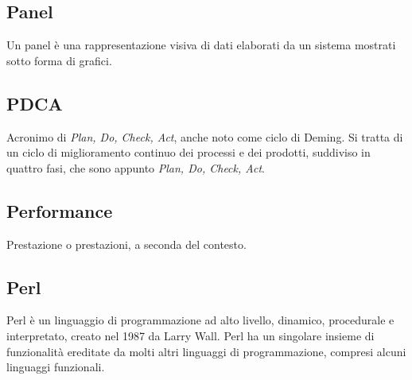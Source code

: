 	
	\subsection{Panel}
	\label{sec:panel}
	Un panel è una rappresentazione visiva di dati elaborati da un sistema mostrati sotto forma di grafici.
	
	
	\subsection{PDCA}	
	\label{sec:pdca}
	Acronimo di \emph{Plan, Do, Check, Act}, anche noto come ciclo di Deming. Si tratta di un ciclo di miglioramento continuo dei processi e dei prodotti, suddiviso in quattro fasi, che sono appunto \emph{Plan, Do, Check, Act}.
	
	\subsection{Performance}	
	\label{sec:performance}
	Prestazione o prestazioni, a seconda del contesto.

	\subsection{Perl}
	Perl è un linguaggio di programmazione ad alto livello, dinamico, procedurale e interpretato, creato nel 1987 da Larry Wall. Perl ha un singolare insieme di funzionalità ereditate da molti altri linguaggi di programmazione, compresi alcuni linguaggi funzionali.
	
	

